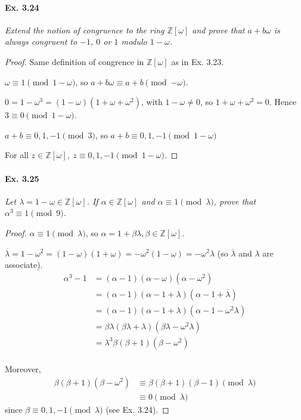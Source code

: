 \documentclass[11pt,a4paper]{article}
\newcommand{\Z}{\mathbb{Z}}
\begin{document}
{\paragraph{Ex. 3.24}

{\it Extend the notion of congruence to the ring $\Z[\omega]$ and prove that $a + b\omega$ is always congruent to $-1$, $0$ or $1$ modulo $1 - \omega$.
}

\begin{proof}
Same definition of congrence in $\Z[\omega]$ as in Ex. 3.23.

$\omega \equiv 1 \pmod{1-\omega}$, so $a+b\omega \equiv a+b \pmod{-\omega}$.

$0 = 1-\omega^3 = (1- \omega)(1+\omega+\omega^2)$, with $1-\omega \neq 0$, so  $1+\omega+\omega^2 = 0$. Hence $3 \equiv 0 \pmod{1-\omega}$.

$a+b \equiv 0,1,-1 \pmod 3$, so $a+b \equiv 0,1,-1 \pmod {1-\omega}$

For all $z \in \Z[\omega],\  z \equiv 0,1,-1 \pmod{1-\omega}$.
\end{proof}

\paragraph{Ex. 3.25} 

{\it Let $\lambda = 1 -\omega \in \Z[\omega]$. If $\alpha \in \Z[\omega]$ and $\alpha \equiv 1 \pmod \lambda$, prove that $\alpha^3 \equiv 1 \pmod 9$.
}

\begin{proof} 
$\alpha \equiv 1 \pmod \lambda$, so $\alpha = 1 + \beta \lambda, \beta \in \Z[\omega]$.

$\overline{\lambda} = 1 - \omega^2 = (1-\omega)(1+\omega) = -\omega^2(1-\omega) = -\omega^2 \lambda$ (so $\overline{\lambda}$ and $\lambda$ are associate).
\begin{align*}
\alpha^3-1&=(\alpha-1)(\alpha-\omega)(\alpha-\omega^2)\\
&=(\alpha-1)(\alpha-1+\lambda)(\alpha-1+\overline{\lambda})\\
&=(\alpha-1)(\alpha-1+\lambda)(\alpha-1-\omega^2\lambda)\\
&=\beta \lambda (\beta\lambda + \lambda) (\beta \lambda - \omega^2\lambda)\\
&=\lambda^3 \beta (\beta+1)(\beta-\omega^2)\\
\end{align*}

Moreover, 
\begin{align*}
\beta(\beta+1)(\beta-\omega^2) &\equiv \beta(\beta+1)(\beta-1) \pmod \lambda\\
&\equiv 0 \pmod \lambda
\end{align*}
since $\beta \equiv 0,1,-1 \pmod \lambda$ (see Ex. 3.24).


\end{proof}}
\end{document}
